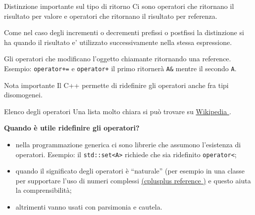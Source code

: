 \documentclass[xcolor={dvipsnames, svgnames, x11names, table}, 10pt]{beamer}
\begin{document}



\begin{frame}[fragile]{Distinzione importante sul tipo di ritorno}
Ci sono operatori che ritornano il risultato per valore e operatori che ritornano il risultato per referenza.

Come nel caso degli incrementi o decrementi prefissi o postfissi la distinzione si ha quando il risultato e’ utilizzato successivamente nella stessa espressione.

Gli operatori che modificano l'oggetto chiamante ritornando una reference.
Esempio: \texttt{operator+=} e \texttt{operator+} il primo ritornerà \texttt{A&} mentre il secondo \texttt{A}.

\begin{block}{Nota importante}
Il C++ permette di ridefinire gli operatori anche fra tipi disomogenei.
\end{block}
\end{frame}

\begin{frame}{Elenco degli operatori}
Una lista molto chiara si può trovare su \href{https://en.wikipedia.org/wiki/Operators\_in\_C\_and\_C\%2B\%2B}{Wikipedia \ExternalLink}.

\textbf{Quando è utile ridefinire gli operatori?}
\begin{itemize}[<+- | alert@+>]
    \item nella programmazione generica ci sono librerie che assumono l'esistenza di operatori. Esempio: il \texttt{std::set<A>} richiede che sia ridefinito \texttt{operator<};
    \item quando il significato degli operatori è \enquote{naturale} (per esempio in una classe per supportare l'uso di numeri complessi \href{https://www.cplusplus.com/reference/complex/complex/operators/}{(cplusplus reference \ExternalLink)} e questo aiuta la comprensibilità;
    \item altrimenti vanno usati con parsimonia e cautela.
\end{itemize}
\end{frame}
\end{document}
